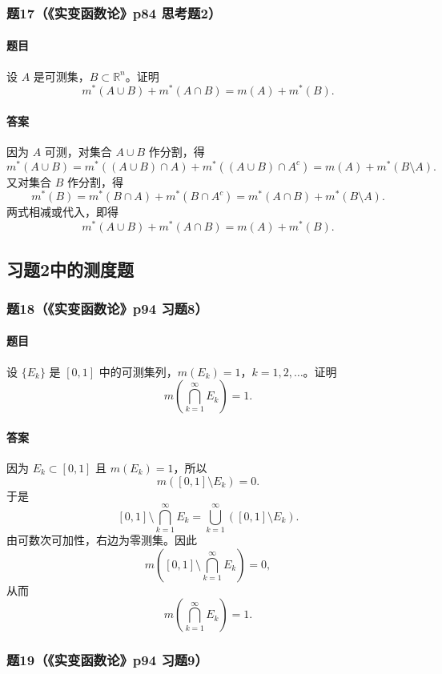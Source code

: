 \documentclass{article}
\newcommand{\R}{\mathbb{R}}
\newcommand{\meas}{m}
\newcommand{\mouter}{m^*}
\begin{document}
\subsubsection*{题17（《实变函数论》p84 思考题2）}
\paragraph{题目}设 $A$ 是可测集，$B\subset\R^n$。证明
\[
\mouter(A\cup B)+\mouter(A\cap B)=\meas(A)+\mouter(B).
\]

\paragraph{答案}因为 $A$ 可测，对集合 $A\cup B$ 作分割，得
\[
\mouter(A\cup B)
=\mouter((A\cup B)\cap A)+\mouter((A\cup B)\cap A^c)
=\meas(A)+\mouter(B\setminus A).
\]
又对集合 $B$ 作分割，得
\[
\mouter(B)=\mouter(B\cap A)+\mouter(B\cap A^c)
=\mouter(A\cap B)+\mouter(B\setminus A).
\]
两式相减或代入，即得
\[
\mouter(A\cup B)+\mouter(A\cap B)=\meas(A)+\mouter(B).
\]

\subsection{习题2中的测度题}

\subsubsection*{题18（《实变函数论》p94 习题8）}
\paragraph{题目}设 $\{E_k\}$ 是 $[0,1]$ 中的可测集列，$\meas(E_k)=1$，$k=1,2,\ldots$。证明
\[
\meas\left(\bigcap_{k=1}^{\infty}E_k\right)=1.
\]

\paragraph{答案}因为 $E_k\subset[0,1]$ 且 $\meas(E_k)=1$，所以
\[
\meas([0,1]\setminus E_k)=0.
\]
于是
\[
[0,1]\setminus\bigcap_{k=1}^{\infty}E_k
=\bigcup_{k=1}^{\infty}([0,1]\setminus E_k).
\]
由可数次可加性，右边为零测集。因此
\[
\meas\left([0,1]\setminus\bigcap_{k=1}^{\infty}E_k\right)=0,
\]
从而
\[
\meas\left(\bigcap_{k=1}^{\infty}E_k\right)=1.
\]

\subsubsection*{题19（《实变函数论》p94 习题9）}
\end{document}
